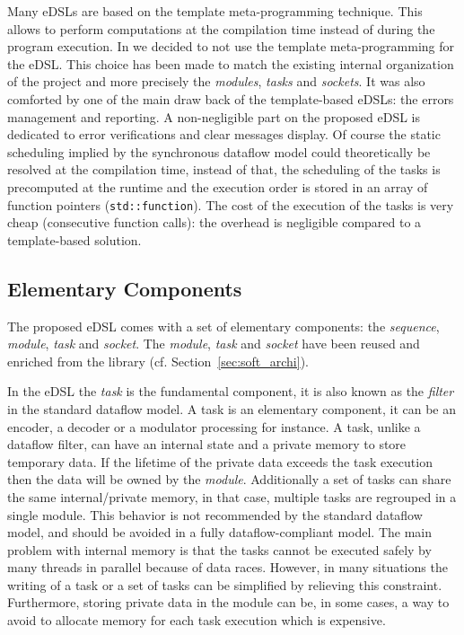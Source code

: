Many \Cxx eDSLs are based on the template meta-programming technique. This
allows to perform computations at the compilation time instead of during the
program execution. In \AFFECT we decided to not use the \Cxx template
meta-programming for the eDSL. This choice has been made to match the existing
internal organization of the project and more precisely the \emph{modules},
\emph{tasks} and \emph{sockets}. It was also comforted by one of the main draw
back of the template-based eDSLs: the errors management and reporting. A
non-negligible part on the proposed eDSL is dedicated to error verifications and
clear messages display. Of course the static scheduling implied by the
synchronous dataflow model could theoretically be resolved at the compilation
time, instead of that, the scheduling of the tasks is precomputed at the
runtime and the execution order is stored in an array of function pointers
(\verb|std::function|). The cost of the execution of the tasks is very cheap
(consecutive function calls): the overhead is negligible compared to a
template-based solution.

\subsection{Elementary Components}

The proposed eDSL comes with a set of elementary components: the
\emph{sequence}, \emph{module}, \emph{task} and \emph{socket}. The
\emph{module}, \emph{task} and \emph{socket} have been reused and enriched
from the \AFFECT library (cf. Section~\ref{sec:soft_archi}).

In the eDSL the \emph{task} is the fundamental component, it is also known as
the \emph{filter} in the standard dataflow model. A task is an elementary
component, it can be an encoder, a decoder or a modulator processing for
instance. A task, unlike a dataflow filter, can have an internal state and a
private memory to store temporary data. If the lifetime of the private data
exceeds the task execution then the data will be owned by the \emph{module}.
Additionally a set of tasks can share the same internal/private memory, in that
case, multiple tasks are regrouped in a single module. This behavior is not
recommended by the standard dataflow model, and should be avoided in a fully
dataflow-compliant model. The main problem with internal memory is that the
tasks cannot be executed safely by many threads in parallel because of data
races. However, in many situations the writing of a task or a set of tasks can
be simplified by relieving this constraint. Furthermore, storing private data in
the module can be, in some cases, a way to avoid to allocate memory for each
task execution which is expensive.

